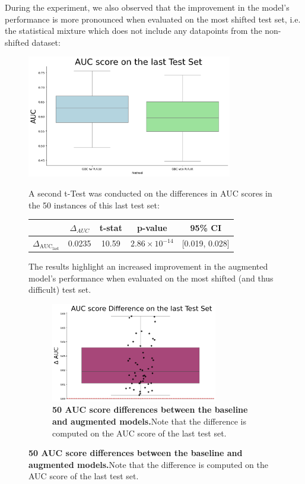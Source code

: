 During the experiment, we also observed that the improvement in the model's performance is more pronounced when evaluated on the most shifted test set, i.e. the statistical mixture which does not include any datapoints from the non-shifted dataset:
\begin{figure}[H]
    \centering
    \includegraphics[width=0.8\textwidth]{assets/MeanAUCscoreLAST.png} 
    \caption{\textbf{Model Performances on the Most Shifted Test Set.}}

A second t-Test was conducted on the differences in AUC scores in the 50 instances of this last test set:


\begin{table}
    \centering
    
    \begin{tabular}{lcccc}
        \toprule
        & $\Delta_{AUC}$ & t-stat & p-value & 95\% CI \\
        \midrule
        $\Delta_{\text{AUC}_{\text{last}}}$ & 0.0235 & 10.59 & $2.86 \times 10^{-14}$ & [0.019, 0.028] \\
        \bottomrule
    \end{tabular}
\end{table}

The results highlight an increased improvement in the augmented model's performance when evaluated on the most shifted (and thus difficult) test set. 

\begin{figure}[H]
    \centering
    \includegraphics[width=0.8\textwidth]{assets/meandiffLAST.png} 
    \caption{\textbf{50 AUC score differences between the baseline and augmented models.}Note that the difference is computed on the AUC score of the last test set.}


\end{figure}
\end{figure}

